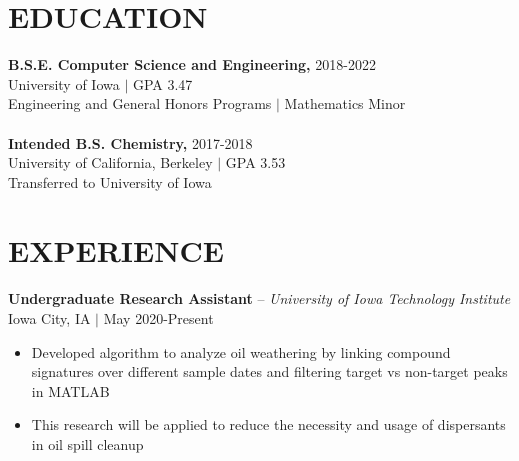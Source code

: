 \documentclass[line,margin]{res}
\begin{document}
\address{(319) 457-6000 $|$ azelenski@uiowa.edu}

\begin{resume}
 
\section{EDUCATION}
    {\bf B.S.E. Computer Science and Engineering,} {\small 2018-2022}  \\
    University of Iowa $|$ GPA 3.47 \\
    { Engineering and General Honors Programs $|$ Mathematics Minor} \\
    \\
    {\bf Intended B.S. Chemistry,} {\small 2017-2018}  \\
    University of California, Berkeley $|$ GPA 3.53 \\
    { Transferred to University of Iowa}
    
\section{EXPERIENCE}


    {\bf Undergraduate Research Assistant} -- {\sl University of Iowa Technology Institute} \\
    {\footnotesize Iowa City, IA $|$ May 2020-Present}

    \begin{itemize} \itemsep -2pt
       \item Developed algorithm to analyze oil weathering by linking compound signatures over different sample dates and filtering target vs non-target peaks in MATLAB
        \item This research will be applied to reduce the necessity and usage of dispersants in oil spill cleanup
    \end{itemize}



\end{resume}
\end{document}
